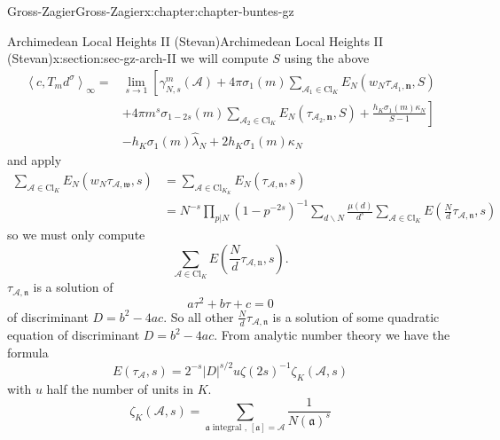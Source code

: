 \documentclass[oneside,10pt,]{book}
\numberwithin{equation}{section}
\newcommand{\amp}{&}
\begin{document}
\begin{chapterptx}{Gross-Zagier}{}{Gross-Zagier}{}{}{x:chapter:chapter-buntes-gz}
\begin{sectionptx}{Archimedean Local Heights II (Stevan)}{}{Archimedean Local Heights II (Stevan)}{}{}{x:section:sec-gz-arch-II}
we will compute \(S\) using the above%
\begin{equation*}
\begin{aligned}\left\langle c, T_{m} d^{\sigma}\right\rangle_{\infty}=\amp \lim _{s \rightarrow 1}\left[\gamma_{N, s}^{m}(\mathscr{A})+4 \pi \sigma_{1}(m) \sum_{\mathscr{A}_{1} \in \mathrm{Cl}_{K}} E_{N}\left(w_{N} \tau_{\mathscr{A}_{1}, \mathbf{n}}, S\right)\right.\\ \amp\left.+4 \pi m^{s} \sigma_{1-2 s}(m) \sum_{\mathscr{A}_{2} \in \mathrm{Cl}_{K}} E_{N}\left(\tau_{\mathscr{A}_{2}, \mathbf{n}}, S\right)+\frac{h_{K} \sigma_{1}(m) \kappa_{N}}{S-1}\right] \\ \amp-h_{K} \sigma_{1}(m) \hat{\lambda}_{N}+2 h_{K} \sigma_{1}(m) \kappa_{N} \end{aligned}
\end{equation*}
and apply%
\begin{equation*}
\begin{aligned} \sum_{\mathscr{A} \in \mathrm{Cl}_{K}} E_{N}\left(w_{N} \tau_{\mathscr{A}, \mathfrak{w}}, s\right) \amp=\sum_{\mathscr{A} \in \mathrm{Cl}_{K_ { K }}} E_{N}\left(\tau_{\mathscr{A}, \mathfrak{n}}, s\right) \\ \amp=N^{-s} \prod_{p | N}\left(1-p^{-2 s}\right)^{-1} \sum_{d \backslash N} \frac{\mu(d)}{d^{s}} \sum_{\mathscr{A} \in \mathbb{Cl}_{K}} E\left(\frac{N}{d} \tau_{\mathscr{A}, \mathfrak{n}}, s\right) \end{aligned}
\end{equation*}
so we must only compute%
\begin{equation*}
\sum_{\mathscr{A} \in \mathrm{Cl}_{K}} E\left(\frac{N}{d} \tau_{\mathscr{A}, \mathrm{n}}, s\right)\text{.}
\end{equation*}
\(\tau _{\mathscr A, \mathfrak n}\) is a solution of%
\begin{equation*}
a\tau ^2 + b\tau  + c = 0
\end{equation*}
of discriminant \(D = b^2 -4ac\). So all other \(\frac Nd \tau _{\mathscr A, \mathfrak n}\) is a solution of some quadratic equation of discriminant \(D = b^2 -4ac\). From analytic number theory we have the formula%
\begin{equation*}
E\left(\tau_{\mathscr{A}}, s\right)=2^{-s}|D|^{s / 2} u \zeta(2 s)^{-1} \zeta_{K}(\mathscr{A}, s)
\end{equation*}
with \(u\) half the number of units in \(K\).%
\begin{equation*}
\zeta_{K}(\mathscr{A}, s)=\sum_{\mathfrak{a} \text { integral } ,\,[\mathfrak{a}]=\mathscr{A}} \frac{1}{N(\mathfrak{a})^{s}}

\end{equation*}
\end{sectionptx}
\end{chapterptx}
\end{document}
